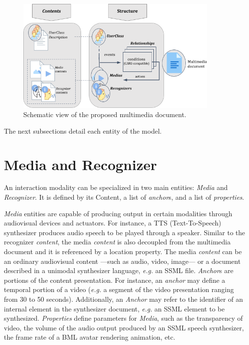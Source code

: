 \documentclass[
  doutorado,
  american
]{ThesisPUC}
\newcommand{\captionvspace}{\vspace{-1.3em}}
\begin{document}
\begin{figure}[!ht]
\begin{center}
	\includegraphics[width=10cm, keepaspectratio]{img/img10.png}
	\caption{Schematic view of the proposed multimedia document.}
	\label{fig:shematic}
    \captionvspace
\end{center}
\end{figure}

The next subsections detail each entity of the model.

\section{Media and Recognizer}
\label{sec:approuach:node} An interaction modality can be specialized in two
main entities: \textit{Media} and 
\textit{Recognizer}. It is defined by its Content, a list of \textit{anchor}s,
and a list of \textit{properties}.

\textit{Media} entities are capable of producing output in certain modalities
through audiovisual devices and actuators. For instance, a TTS (Text-To-Speech)
synthesizer produces audio speech to be played through a speaker. Similar to the
recognizer \textit{content}, the media \textit{content} is also decoupled from
the multimedia document and it is referenced by a location property. The media
\textit{content} can be an ordinary audiovisual content —such as audio, video,
image— or a document described in a unimodal synthesizer language, \textit{e.g.} an SSML
file. \textit{Anchor}s are portions of the content presentation. For instance,
an \textit{anchor} may define a temporal portion of a video (\textit{e.g.} a segment of
the video presentation ranging from 30 to 50 seconds). Additionally, an
\textit{Anchor} may refer to the identifier of an internal element in the
synthesizer document, \textit{e.g.} an SSML element to be synthesized. \textit{Properties}
define parameters for \textit{Media}, such as the transparency of video, the
volume of the audio output produced by an SSML speech synthesizer, the frame
rate of a BML avatar rendering animation, etc.
\end{document}
